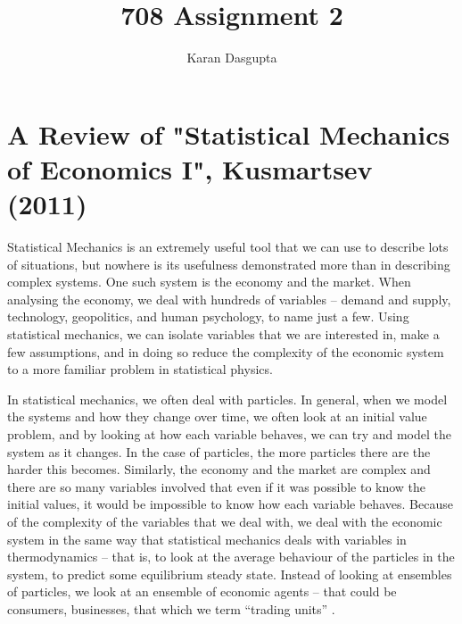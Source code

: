 \documentclass[a4paper, 12pt]{article}
\title{708 Assignment 2}
\date{}
\author{Karan Dasgupta}
\begin{document}
\maketitle


\section*{A Review of "Statistical Mechanics of Economics I", Kusmartsev (2011)}

Statistical Mechanics is an extremely useful tool that we can use to describe lots of situations, but nowhere is its usefulness demonstrated more than in describing complex systems. One such system is the economy and the market. When analysing the economy, we deal with hundreds of variables – demand and supply, technology, geopolitics, and human psychology, to name just a few. Using statistical mechanics, we can isolate variables that we are interested in, make a few assumptions, and in doing so reduce the complexity of the economic system to a more familiar problem in statistical physics. 

In statistical mechanics, we often deal with particles. In general, when we model the systems and how they change over time, we often look at an initial value problem, and by looking at how each variable behaves, we can try and model the system as it changes. In the case of particles, the more particles there are the harder this becomes. Similarly, the economy and the market are complex and there are so many variables involved that even if it was possible to know the initial values, it would be impossible to know how each variable behaves. Because of the complexity of the variables that we deal with, we deal with the economic system in the same way that statistical mechanics deals with variables in thermodynamics – that is, to look at the average behaviour of the particles in the system, to predict some equilibrium steady state. Instead of looking at ensembles of particles, we look at an ensemble of economic agents – that could be consumers, businesses, that which we term “trading units” \cite{kusmartsev}. 
\end{document}
